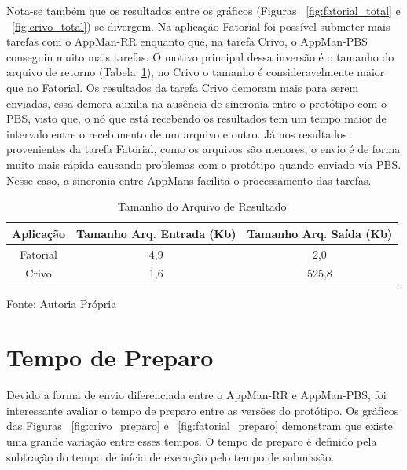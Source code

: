 Nota-se também que os resultados entre os gráficos (Figuras ~\ref{fig:fatorial_total} e ~\ref{fig:crivo_total}) se divergem. Na aplicação Fatorial foi possível submeter mais tarefas com o AppMan-RR enquanto que, na tarefa Crivo, o AppMan-PBS conseguiu muito mais tarefas. O motivo principal dessa inversão é o tamanho do arquivo de retorno (Tabela~\ref{tab:tam_arquivo}), no Crivo o tamanho é consideravelmente maior que no Fatorial. Os resultados da tarefa Crivo demoram mais para serem enviadas, essa demora auxilia na ausência de sincronia entre o protótipo com o PBS, visto que, o nó que está recebendo os resultados tem um tempo maior de intervalo entre o recebimento de um arquivo e outro. 
Já nos resultados provenientes da tarefa Fatorial, como os arquivos são menores, o envio é de forma muito mais rápida causando problemas com o protótipo quando enviado via PBS. Nesse caso, a sincronia entre AppMans facilita o processamento das tarefas.

\begin{table}[hbtp]
\begin{center}
\caption{Tamanho do Arquivo de Resultado}
\label{tab:tam_arquivo}
\begin{tabular}{c|c|c}
	\hline
		{\bf Aplicação } & {\bf Tamanho Arq. Entrada (Kb)} & {\bf Tamanho Arq. Saída (Kb) }\\
	\hline
	Fatorial & 4,9 & 2,0\\ \hline
	Crivo & 1,6 & 525,8\\ \hline
\end{tabular}
\end{center}
\begin{center}
Fonte: Autoria Própria
\end{center}
\end{table}

\section{Tempo de Preparo}

Devido a forma de envio diferenciada entre o AppMan-RR e AppMan-PBS, foi interessante avaliar o tempo de preparo entre as versões do protótipo. Os gráficos das Figuras ~\ref{fig:crivo_preparo} e ~\ref{fig:fatorial_preparo} demonstram que existe uma grande variação entre esses tempos. O tempo de preparo é definido pela subtração do tempo de início de execução pelo tempo de submissão.

